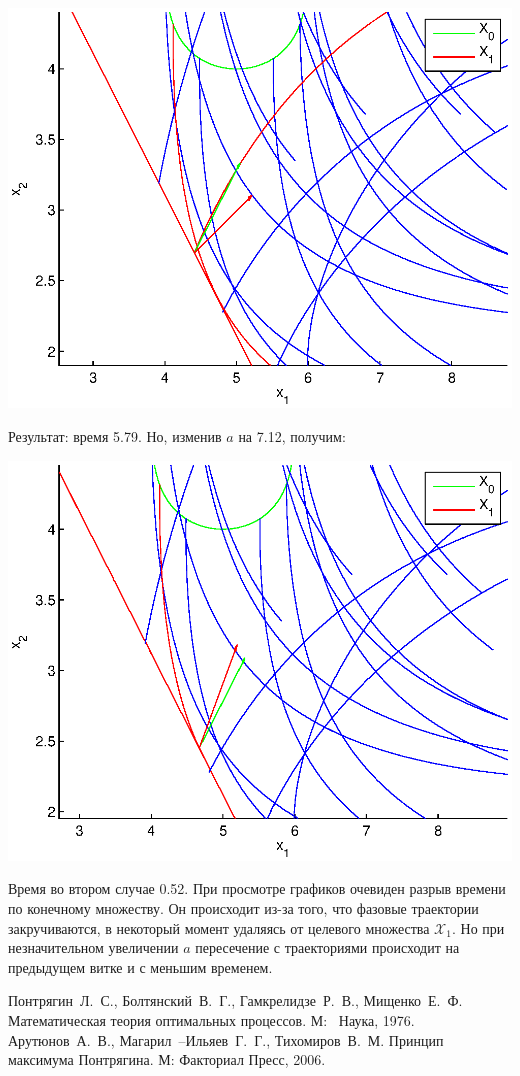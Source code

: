 \documentclass[11pt]{article}
\begin{document}
\includegraphics[scale=1]{pics/pic3_x_7.11_zoom.eps}

Результат: время 5.79. Но, изменив $a$ на 7.12, получим:

\includegraphics[scale=1]{pics/pic3_x_7.12.eps}

Время во втором случае 0.52. При просмотре графиков очевиден разрыв времени по конечному множеству. Он происходит из-за того, что фазовые траектории закручиваются, в некоторый момент удаляясь от целевого множества $\mathcal{X}_1$. Но при незначительном увеличении $a$ пересечение с траекториями происходит на предыдущем витке и с меньшим временем.
\pagebreak
{}
\begin{thebibliography}{99}
	 Понтрягин~Л.~С., Болтянский~В.~Г., Гамкрелидзе~Р.~В., Мищенко~Е.~Ф. Математическая теория оптимальных процессов. М:~ Наука, 1976.
	 Арутюнов~А.~В., Магарил~--Ильяев~Г.~Г., Тихомиров~В.~М. Принцип максимума Понтрягина. М: Факториал Пресс, 2006.
\end{thebibliography}
\end{document}

